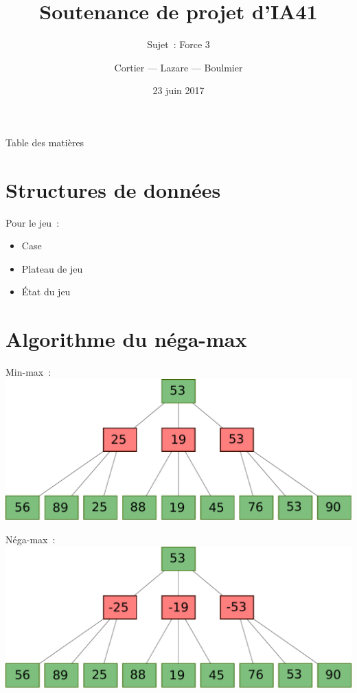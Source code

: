 \documentclass[11pt]{beamer}
\author{Cortier — Lazare — Boulmier}
\institute[]{UTBM}
\title{Soutenance de projet d'IA41}
\subtitle{Sujet : Force 3}
\date{23 juin 2017}
\begin{document}
\begin{frame}
    \titlepage{}
\end{frame}

\begin{frame}{Table des matières}
    \tableofcontents
\end{frame}

\section{Structures de données}

\begin{frame}
    \begin{block}{Pour le jeu :}
            \begin{itemize}
                \item Case
                \item Plateau de jeu
                \item État du jeu
            \end{itemize}
    \end{block}
\end{frame}

\section{Algorithme du néga-max}

\begin{frame}
    Min-max :
    \includegraphics[width=\linewidth]{minmax}
\end{frame}

\begin{frame}
    Néga-max :
    \includegraphics[width=\linewidth]{negamax}
\end{frame}
\end{document}
